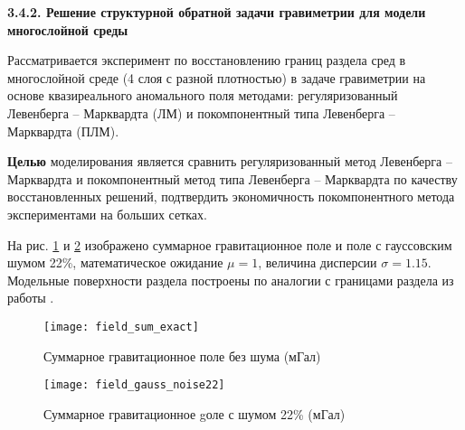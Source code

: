 %
%
% 

\newpage
{\bfseries 3.4.2. Решение структурной обратной задачи гравиметрии для модели многослойной среды} 

Рассматривается эксперимент по восстановлению границ раздела сред в многослойной среде (4 слоя с разной плотностью) в задаче гравиметрии на основе квазиреального аномального поля методами: регуляризованный Левенберга -- Марквардта (ЛМ) и покомпонентный типа Левенберга -- Марквардта (ПЛМ).

{\bfseries Целью} моделирования является сравнить регуляризованный метод Левенберга -- Марквардта и покомпонентный метод типа Левенберга -- Марквардта по качеству восстановленных решений, подтвердить экономичность покомпонентного метода экспериментами на больших сетках.

На рис. \ref{fig:field_sum_exact} и \ref{fig:field_gauss_noise22} изображено суммарное гравитационное поле и поле с гауссовским шумом 22\%, математическое ожидание $\mu=1$, величина дисперсии $\sigma=1.15$. Модельные поверхности раздела построены по аналогии с границами раздела из работы \cite{MarAkiMis2016}.
\begin{figure}[H]
	\centering
	\texttt{[image: field\_sum\_exact]}
	\caption{Суммарное гравитационное поле без шума (мГал)}
	\label{fig:field_sum_exact}
\end{figure}
\begin{figure}[H]
	\centering
	\texttt{[image: field\_gauss\_noise22]}
	\caption{Суммарное гравитационное gоле с шумом 22\% (мГал)}
	\label{fig:field_gauss_noise22}
\end{figure}

